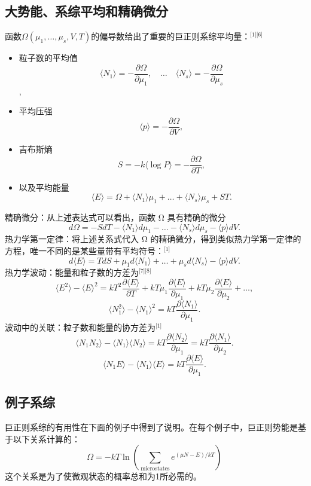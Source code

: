 \subsection{大势能、系综平均和精确微分}
函数\(\Omega(\mu_1,\dots,\mu_s,V,T)\)的偏导数给出了重要的巨正则系综平均量：\(^\text{[1][6]}\)
\begin{itemize}
\item 粒子数的平均值  
\[\langle N_1 \rangle = -\frac{\partial \Omega}{\partial \mu_1}, \quad \dots \quad \langle N_s \rangle = -\frac{\partial \Omega}{\partial \mu_s}~\],  
\item 平均压强  
\[\langle p \rangle = -\frac{\partial \Omega}{\partial V},~\]
\item 吉布斯熵  
\[S = -k \langle \log P \rangle = -\frac{\partial \Omega}{\partial T},~\]
\item 以及平均能量  
\[\langle E \rangle = \Omega + \langle N_1 \rangle \mu_1 + \dots + \langle N_s \rangle \mu_s + S T.~\]
\end{itemize}
精确微分：从上述表达式可以看出，函数 Ω 具有精确的微分
\[
d\Omega = -S dT - \langle N_1 \rangle d\mu_1 - \dots - \langle N_s \rangle d\mu_s - \langle p \rangle dV.~
\]
热力学第一定律：将上述关系式代入 Ω 的精确微分，得到类似热力学第一定律的方程，唯一不同的是某些量带有平均符号：\(^\text{[1]}\)
\[
d\langle E \rangle = T dS + \mu_1 d\langle N_1 \rangle + \dots + \mu_s d\langle N_s \rangle - \langle p \rangle dV.~
\]
热力学波动：能量和粒子数的方差为\(^\text{[7][8]}\)
\[
\langle E^2 \rangle - \langle E \rangle^2 = k T^2 \frac{\partial \langle E \rangle}{\partial T} + k T \mu_1 \frac{\partial \langle E \rangle}{\partial \mu_1} + k T \mu_2 \frac{\partial \langle E \rangle}{\partial \mu_2} + \dots ,~
\]
\[
\langle N_1^2 \rangle - \langle N_1 \rangle^2 = k T \frac{\partial \langle N_1 \rangle}{\partial \mu_1}.~
\]
波动中的关联：粒子数和能量的协方差为\(^\text{[1]}\)
\[
\langle N_1 N_2 \rangle - \langle N_1 \rangle \langle N_2 \rangle = k T \frac{\partial \langle N_2 \rangle}{\partial \mu_1} = k T \frac{\partial \langle N_1 \rangle}{\partial \mu_2}.~
\]
\[
\langle N_1 E \rangle - \langle N_1 \rangle \langle E \rangle = k T \frac{\partial \langle E \rangle}{\partial \mu_1}.~
\]
\subsection{例子系综}
巨正则系综的有用性在下面的例子中得到了说明。在每个例子中，巨正则势能是基于以下关系计算的：
\[
\Omega = -kT \ln \left( \sum_{\text{microstates}} e^{(\mu N - E)/kT}\right)~
\]
这个关系是为了使微观状态的概率总和为1所必需的。
